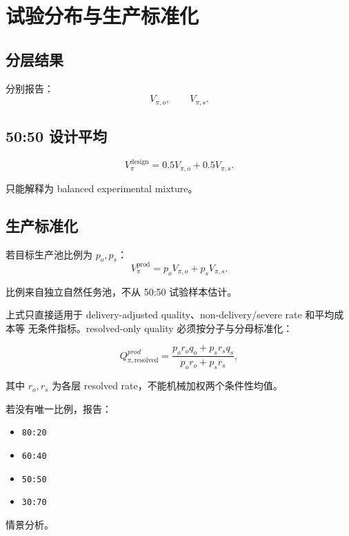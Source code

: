 \section{试验分布与生产标准化}

\subsection{分层结果}

分别报告：
\[
V_{\pi,o},\qquad V_{\pi,s}.
\]

\subsection{50:50 设计平均}

\[
V_\pi^{\mathrm{design}}
=
0.5V_{\pi,o}+0.5V_{\pi,s}.
\]

只能解释为 balanced experimental mixture。

\subsection{生产标准化}

若目标生产池比例为 \(p_o,p_s\)：
\[
V_\pi^{\mathrm{prod}}
=
p_oV_{\pi,o}+p_sV_{\pi,s}.
\]

比例来自独立自然任务池，不从 50:50 试验样本估计。

上式只直接适用于 delivery-adjusted quality、non-delivery/severe rate 和平均成本等
无条件指标。resolved-only quality 必须按分子与分母标准化：

\[
Q_{\pi,\mathrm{resolved}}^{prod}
=
\frac{p_o r_o q_o+p_s r_s q_s}{p_o r_o+p_s r_s},
\]

其中 \(r_o,r_s\) 为各层 resolved rate，不能机械加权两个条件性均值。

若没有唯一比例，报告：
\begin{itemize}
  \item \texttt{80:20}
  \item \texttt{60:40}
  \item \texttt{50:50}
  \item \texttt{30:70}
\end{itemize}
情景分析。
